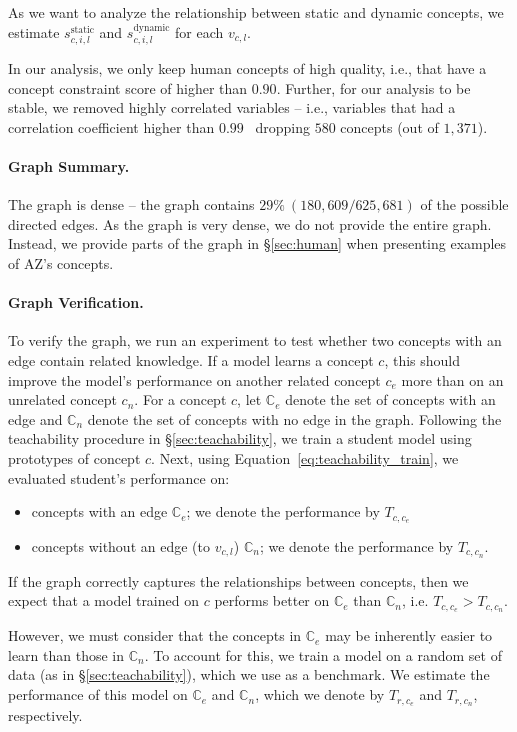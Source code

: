 \documentclass{article}
\def\vcl{v_{c,l}}
\begin{document}
As we want to analyze the relationship between static and dynamic concepts, we estimate $s_{c,i,l}^{\text{static}}$ and $s_{c,i,l}^{\text{dynamic}}$ for each $\vcl$. 

In our analysis, we only keep human concepts of high quality, i.e., that have a concept constraint score of higher than $0.90$. Further, for our analysis to be stable, we removed highly correlated variables -- i.e., variables that had a correlation coefficient higher than $0.99$~\citep{robinson1974fitting, snee1973some, snee1984comment} dropping $580$ concepts (out of $1,371$).

\paragraph{Graph Summary.}
The graph is dense -- the graph contains $29\% \ (180,609/625,681)$ of the possible directed edges.
As the graph is very dense, we do not provide the entire graph. Instead, we provide parts of the graph in \S\ref{sec:human} when presenting examples of AZ's concepts. 

\paragraph{Graph Verification.}
To verify the graph, we run an experiment to test whether two concepts with an edge contain related knowledge.
If a model learns a concept $c$, this should improve the model's performance on another related concept $c_e$ more than on an unrelated concept $c_n$. 
For a concept $c$, let $\mathbb{C}_e$ denote the set of concepts with an edge and $\mathbb{C}_n$ denote the set of concepts with no edge in the graph.
Following the teachability procedure in \S\ref{sec:teachability}, we train a student model using prototypes of concept $c$.
Next, using Equation~\ref{eq:teachability_train}, we evaluated student's performance on:
\begin{itemize}
    \item concepts with an edge $\mathbb{C}_e$; we denote the performance by $T_{c, c_e}$ 
    \item concepts without an edge (to $\vcl$) $\mathbb{C}_n$; we denote the performance by  $T_{c, c_n}$.
\end{itemize}
If the graph correctly captures the relationships between concepts, then we expect that a model trained on $c$ performs better on $\mathbb{C}_e$ than $\mathbb{C}_n$, i.e. $T_{c, c_e} > T_{c, c_n}$. 

However, we must consider that the concepts in $\mathbb{C}_e$ may be inherently easier to learn than those in $\mathbb{C}_n$. 
To account for this, we train a model on a random set of data (as in \S\ref{sec:teachability}), which we use as a benchmark. 
We estimate the performance of this model on $\mathbb{C}_e$ and $\mathbb{C}_n$, which we denote by $T_{r, c_e}$ and $T_{r, c_n}$, respectively. 
\end{document}
